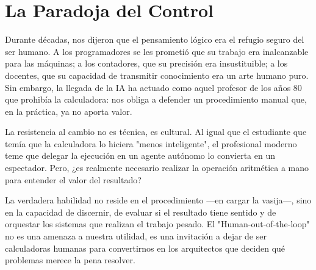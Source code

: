 \chapter{La Paradoja del Control}

Durante décadas, nos dijeron que el pensamiento lógico era el refugio seguro del ser humano. A los programadores se les prometió que su trabajo era inalcanzable para las máquinas; a los contadores, que su precisión era insustituible; a los docentes, que su capacidad de transmitir conocimiento era un arte humano puro. Sin embargo, la llegada de la IA ha actuado como aquel profesor de los años 80 que prohibía la calculadora: nos obliga a defender un procedimiento manual que, en la práctica, ya no aporta valor.

La resistencia al cambio no es técnica, es cultural. Al igual que el estudiante que temía que la calculadora lo hiciera "menos inteligente", el profesional moderno teme que delegar la ejecución en un agente autónomo lo convierta en un espectador. Pero, ¿es realmente necesario realizar la operación aritmética a mano para entender el valor del resultado? 

La verdadera habilidad no reside en el procedimiento —en cargar la vasija—, sino en la capacidad de discernir, de evaluar si el resultado tiene sentido y de orquestar los sistemas que realizan el trabajo pesado. El "Human-out-of-the-loop" no es una amenaza a nuestra utilidad, es una invitación a dejar de ser calculadoras humanas para convertirnos en los arquitectos que deciden qué problemas merece la pena resolver.